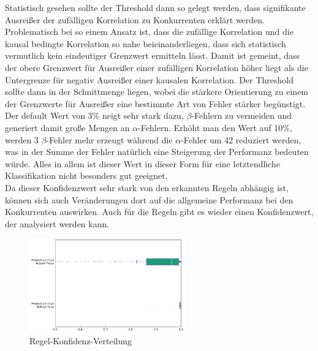 Statistisch gesehen sollte der Threshold dann so gelegt werden, dass signifikante Ausreißer der zufälligen Korrelation zu Konkurrenten erklärt werden. Problematisch bei so einem Ansatz ist, dass die zufällige Korrelation und die kausal bedingte Korrelation so nahe beieinanderliegen, dass sich statistisch vermutlich kein eindeutiger Grenzwert ermitteln lässt. Damit ist gemeint, dass der obere Grenzwert für Ausreißer einer zufälligen Korrelation höher liegt als die Untergrenze für negativ Ausreißer einer kausalen Korrelation. Der Threshold sollte dann in der Schnittmenge liegen, wobei die stärkere Orientierung zu einem der Grenzwerte für Ausreißer eine bestimmte Art von Fehler stärker begünstigt. Der default Wert von 3\% neigt sehr stark dazu, $\beta$-Fehlern zu vermeiden und generiert damit große Mengen an $\alpha$-Fehlern. Erhöht man den Wert auf 10\%, werden 3 $\beta$-Fehler mehr erzeugt während die $\alpha$-Fehler um 42 reduziert werden, was in der Summe der Fehler natürlich eine Steigerung der Performanz bedeuten würde. Alles in allem ist dieser Wert in dieser Form für eine letztendliche Klassifikation nicht besonders gut geeignet.\\
Da dieser Konfidenzwert sehr stark von den erkannten Regeln abhängig ist, können sich auch Veränderungen dort auf die allgemeine Performanz bei den Konkurrenten auswirken. Auch für die Regeln gibt es wieder einen Konfidenzwert, der analysiert werden kann.

\begin{figure}[!ht]
	\center
	\includegraphics[width=0.6\textwidth]{Bilder/rule_conf_boxplot.png}
	\caption{Regel-Konfidenz-Verteilung}
	\label{fig:RKV}
\end{figure}

